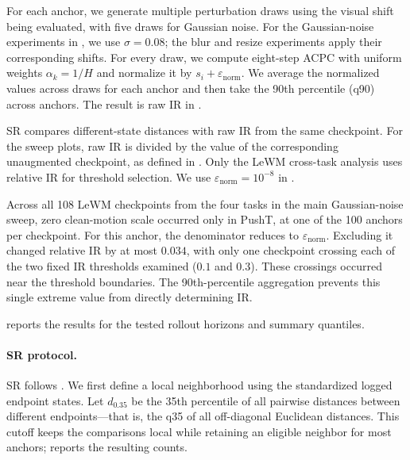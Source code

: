 \documentclass{article}
\begin{document}
For each anchor, we generate multiple perturbation draws using the visual
shift being evaluated, with five draws for Gaussian noise. For the Gaussian-noise
experiments in , we use $\sigma=0.08$; the
blur and resize experiments apply their corresponding shifts. For every draw,
we compute eight-step ACPC with uniform weights $\alpha_k=1/H$ and normalize it
by $s_i+\varepsilon_{\mathrm{norm}}$. We average the normalized values across
draws for each anchor and then take the 90th percentile (q90) across anchors.
The result is raw IR in
.

SR compares different-state distances with raw IR from the same checkpoint.
For the sweep plots, raw IR is divided by the value of the corresponding
unaugmented checkpoint, as defined in . Only the LeWM
cross-task analysis uses relative IR for threshold selection. We use
$\varepsilon_{\mathrm{norm}}=10^{-8}$ in
.

Across all 108 LeWM checkpoints from the four tasks in the main Gaussian-noise
sweep, zero clean-motion scale occurred only in PushT, at one of the 100
anchors per checkpoint. For this anchor, the denominator reduces to
$\varepsilon_{\mathrm{norm}}$. Excluding it changed relative IR by at most
$0.034$, with only one checkpoint crossing each of the two fixed IR thresholds
examined ($0.1$ and $0.3$). These crossings occurred near the threshold
boundaries. The 90th-percentile aggregation prevents this single extreme value
from directly determining IR.

 reports the results for the tested
rollout horizons and summary quantiles.



\paragraph{SR protocol.}
SR follows . We first define a local neighborhood using the
standardized logged endpoint states. Let $d_{0.35}$ be the 35th percentile of
all pairwise distances between different endpoints---that is, the q35 of all off-diagonal Euclidean distances.
This cutoff keeps the comparisons local while retaining an eligible neighbor for most anchors;
 reports the resulting counts.
\end{document}
